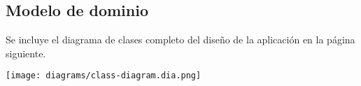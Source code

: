 \subsection{Modelo de dominio}

Se incluye el diagrama de clases completo del diseño de la aplicación en la
página siguiente.

\clearpage

\begin{sidewaysfigure}
    \texttt{[image: diagrams/class-diagram.dia.png]}
\end{sidewaysfigure}

\clearpage
